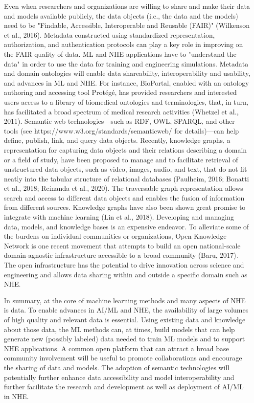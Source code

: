 Even when researchers and organizations are willing to share and make their data and models available publicly, the data objects (i.e., the data and the models) need to be "Findable, Accessible, Interoperable and Reusable (FAIR)" (Wilkenson et al., 2016). Metadata constructed using standardized representation, authorization, and authentication protocols can play a key role in improving on the FAIR quality of data. ML and NHE applications have to "understand the data" in order to use the data for training and engineering simulations. Metadata and domain ontologies will enable data shareability, interoperability and usability, and advances in ML and NHE. For instance, BioPortal, enabled with an ontology authoring and accessing tool Protégé, has provided researchers and interested users access to a library of biomedical ontologies and terminologies, that, in turn, has facilitated a broad spectrum of medical research activities (Whetzel et al., 2011). Semantic web technologies—such as RDF, OWL, SPARQL, and other tools (see https://www.w3.org/standards/semanticweb/ for details)—can help define, publish, link, and query data objects. Recently, knowledge graphs, a representation for capturing data objects and their relations describing a domain or a field of study, have been proposed to manage and to facilitate retrieval of unstructured data objects, such as video, images, audio, and text, that do not fit neatly into the tabular structure of relational databases (Paulheim, 2016; Bonatti et al., 2018; Reinanda et al., 2020). The traversable graph representation allows search and access to different data objects and enables the fusion of information from different sources. Knowledge graphs have also been shown great promise to integrate with machine learning (Lin et al., 2018). Developing and managing data, models, and knowledge bases is an expensive endeavor. To alleviate some of the burdens on individual communities or organizations, Open Knowledge Network is one recent movement that attempts to build an open national-scale domain-agnostic infrastructure accessible to a broad community (Baru, 2017). The open infrastructure has the potential to drive innovation across science and engineering and allows data sharing within and outside a specific domain such as NHE.

In summary, at the core of machine learning methods and many aspects of NHE is data. To enable advances in AI/ML and NHE, the availability of large volumes of high quality and relevant data is essential. Using existing data and knowledge about those data, the ML methods can, at times, build models that can help generate new (possibly labeled) data needed to train ML models and to support NHE applications. A common open platform that can attract a broad base community involvement will be useful to promote collaborations and encourage the sharing of data and models. The adoption of semantic technologies will potentially further enhance data accessibility and model interoperability and further facilitate the research and development as well as deployment of AI/ML in NHE. 

